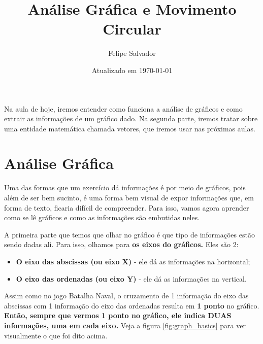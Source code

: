 \documentclass[12pt]{extarticle}
\title{Análise Gráfica e Movimento Circular}
\author{Felipe Salvador}
\date{Atualizado em \today}
\newcommand{\<}{\langle}
\renewcommand{\>}{\rangle}
\theoremstyle{definition}
\begin{document}
\maketitle

Na aula de hoje, iremos entender como funciona a análise de gráficos e como extrair as informações de um gráfico dado. Na segunda parte, iremos tratar sobre uma entidade matemática chamada vetores, que iremos usar nas próximas aulas.

\section{Análise Gráfica}

Uma das formas que um exercício dá informações é por meio de gráficos, pois além de ser bem sucinto, é uma forma bem visual de expor informações que, em forma de texto, ficaria difícil de compreender. Para isso, vamos agora aprender como se lê gráficos e como as informações são embutidas neles.

A primeira parte que temos que olhar no gráfico é que tipo de informações estão sendo dadas ali. Para isso, olhamos para \textbf{os eixos do gráficos.} Eles são 2:

\begin{itemize}
    \item \textbf{O eixo das abscissas (ou eixo X)} - ele dá as informações na horizontal;
    \item \textbf{O eixo das ordenadas (ou eixo Y)} - ele dá as informações na vertical.
\end{itemize}

Assim como no jogo Batalha Naval, o cruzamento de 1 informação do eixo das abscissas com 1 informação do eixo das ordenadas resulta em \textbf{1 ponto} no gráfico. \textbf{Então, sempre que vermos 1 ponto no gráfico, ele indica DUAS informações, uma em cada eixo.} Veja a figura \ref{fig:graph_basics} para ver visualmente o que foi dito acima.
\end{document}
